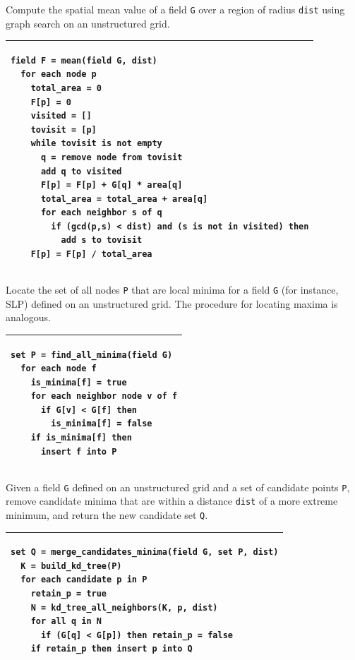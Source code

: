\documentclass[gmdd, hvmath, online]{copernicus_discussions}
\begin{document}

\begin{algorithm}
\caption{Compute the spatial mean value of a field \texttt{G} over a region of radius \texttt{dist} using graph search on an unstructured grid.\ \\} \label{alg:field_mean_value}
\noindent \begin{tabular}{p{5in}}
\hline \small \begin{verbatim}
field F = mean(field G, dist)
  for each node p
    total_area = 0
    F[p] = 0
    visited = []
    tovisit = [p]
    while tovisit is not empty
      q = remove node from tovisit
      add q to visited
      F[p] = F[p] + G[q] * area[q]
      total_area = total_area + area[q]
      for each neighbor s of q
        if (gcd(p,s) < dist) and (s is not in visited) then
          add s to tovisit
    F[p] = F[p] / total_area
\end{verbatim} \\
\hline
\end{tabular}
\end{algorithm}

\begin{algorithm}
\caption{Locate the set of all nodes \texttt{P} that are local minima for a field \texttt{G} (for instance, SLP) defined on an unstructured grid.  The procedure for locating maxima is analogous.\ \\} \label{alg:find_all_minima}
\noindent \begin{tabular}{p{5in}}
\hline \small \begin{verbatim}
set P = find_all_minima(field G)
  for each node f
    is_minima[f] = true
    for each neighbor node v of f
      if G[v] < G[f] then
        is_minima[f] = false
    if is_minima[f] then
      insert f into P
\end{verbatim} \\
\hline
\end{tabular}
\end{algorithm}

\begin{algorithm}
\caption{Given a field \texttt{G} defined on an unstructured grid and a set of candidate points \texttt{P}, remove candidate minima that are within a distance \texttt{dist} of a more extreme minimum, and return the new candidate set \texttt{Q}.\ \\} \label{alg:merge_candidates_minima}
\noindent \begin{tabular}{p{5in}}
\hline \small \begin{verbatim}
set Q = merge_candidates_minima(field G, set P, dist)
  K = build_kd_tree(P)
  for each candidate p in P
    retain_p = true
    N = kd_tree_all_neighbors(K, p, dist)
    for all q in N
      if (G[q] < G[p]) then retain_p = false
    if retain_p then insert p into Q
\end{verbatim} \\
\hline
\end{tabular}
\end{algorithm}
\end{document}
